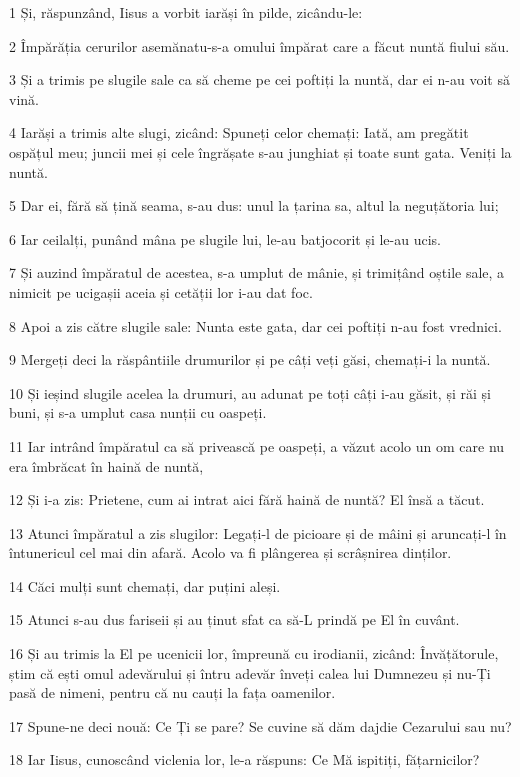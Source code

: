 \par 1 Și, răspunzând, Iisus a vorbit iarăși în pilde, zicându-le:
\par 2 Împărăția cerurilor asemănatu-s-a omului împărat care a făcut nuntă fiului său.
\par 3 Și a trimis pe slugile sale ca să cheme pe cei poftiți la nuntă, dar ei n-au voit să vină.
\par 4 Iarăși a trimis alte slugi, zicând: Spuneți celor chemați: Iată, am pregătit ospățul meu; juncii mei și cele îngrășate s-au junghiat și toate sunt gata. Veniți la nuntă.
\par 5 Dar ei, fără să țină seama, s-au dus: unul la țarina sa, altul la neguțătoria lui;
\par 6 Iar ceilalți, punând mâna pe slugile lui, le-au batjocorit și le-au ucis.
\par 7 Și auzind împăratul de acestea, s-a umplut de mânie, și trimițând oștile sale, a nimicit pe ucigașii aceia și cetății lor i-au dat foc.
\par 8 Apoi a zis către slugile sale: Nunta este gata, dar cei poftiți n-au fost vrednici.
\par 9 Mergeți deci la răspântiile drumurilor și pe câți veți găsi, chemați-i la nuntă.
\par 10 Și ieșind slugile acelea la drumuri, au adunat pe toți câți i-au găsit, și răi și buni, și s-a umplut casa nunții cu oaspeți.
\par 11 Iar intrând împăratul ca să privească pe oaspeți, a văzut acolo un om care nu era îmbrăcat în haină de nuntă,
\par 12 Și i-a zis: Prietene, cum ai intrat aici fără haină de nuntă? El însă a tăcut.
\par 13 Atunci împăratul a zis slugilor: Legați-l de picioare și de mâini și aruncați-l în întunericul cel mai din afară. Acolo va fi plângerea și scrâșnirea dinților.
\par 14 Căci mulți sunt chemați, dar puțini aleși.
\par 15 Atunci s-au dus fariseii și au ținut sfat ca să-L prindă pe El în cuvânt.
\par 16 Și au trimis la El pe ucenicii lor, împreună cu irodianii, zicând: Învățătorule, știm că ești omul adevărului și întru adevăr înveți calea lui Dumnezeu și nu-Ți pasă de nimeni, pentru că nu cauți la fața oamenilor.
\par 17 Spune-ne deci nouă: Ce Ți se pare? Se cuvine să dăm dajdie Cezarului sau nu?
\par 18 Iar Iisus, cunoscând viclenia lor, le-a răspuns: Ce Mă ispitiți, fățarnicilor?
